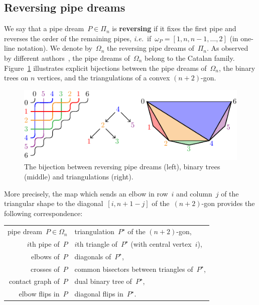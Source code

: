 \documentclass{amsart}
\theoremstyle{definition}
\newcommand{\fref}[1]{Figure~\ref{#1}} %
\newcommand{\ie}{\textit{i.e.}~} %
\newcommand{\defn}[1]{\textbf{\textsf{\color{PineGreen} #1}}} %
\newcommand{\pipeDreams}{\Pi} %
\newcommand{\reversingPipeDreams}{\Omega} %
\newcommand{\duality}{^\star} %
\begin{document}
\subsection{Reversing pipe dreams}
\label{subsec:reversingPipeDreams}

We say that a pipe dream~$P \in \pipeDreams_n$ is \defn{reversing} if it fixes the first pipe and reverses the order of the remaining pipes, \ie if~$\omega_P = [1, n, n-1, \dots, 2]$ (in one-line notation). We denote by~$\reversingPipeDreams_n$ the reversing pipe dreams of~$\pipeDreams_n$. As observed by different authors~\cite{Woo, PilaudPocchiola, Pilaud-these, Stump}, the pipe dreams of~$\reversingPipeDreams_n$ belong to the Catalan family. \fref{fig:bijection} illustrates explicit bijections between the pipe dreams of~$\reversingPipeDreams_n$, the binary trees on $n$ vertices, and the triangulations of a convex $(n+2)$-gon.

\begin{figure}[h]
	\centerline{\includegraphics[scale=1.3]{dualiteTriangulation}}
	\caption{The bijection between reversing pipe dreams (left), binary trees (middle) and triangulations (right).}
	\label{fig:bijection}
\end{figure}

More precisely, the map which sends an elbow in row~$i$ and column~$j$ of the triangular shape to the diagonal~$[i,n+1-j]$ of the~$(n+2)$-gon provides the following correspondence:
\begin{center}
\begin{tabular}{r@{$\quad\longleftrightarrow\quad$}l}
pipe dream~$P \in \reversingPipeDreams_n$ & triangulation~$P\duality$ of the $(n+2)$-gon, \\
$i$th pipe of~$P$ & $i$th triangle of~$P\duality$ (with central vertex~$i$), \\
elbows of~$P$ & diagonals of~$P\duality$, \\
crosses of~$P$ & common bisectors between triangles of~$P\duality$, \\
contact graph of~$P$ & dual binary tree of~$P\duality$, \\
elbow flips in~$P$ & diagonal flips in~$P\duality$.
\end{tabular}
\end{center}
\end{document}
